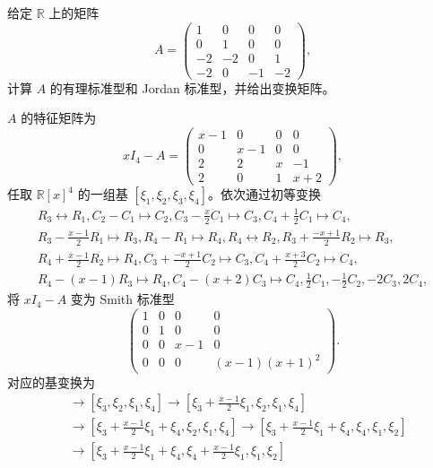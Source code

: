 \documentclass[fontset=none,zihao=-4]{Notes}
\begin{document}
\begin{example}
  给定 $\mathbb{R}$ 上的矩阵
  \[
    A=\begin{pmatrix}
      1 & 0 & 0 & 0 \\
      0 & 1 &  0 & 0 \\
      -2 & -2 & 0 & 1 \\
      -2 & 0 & -1 & -2
    \end{pmatrix}  ,
  \]
  计算 $A$ 的有理标准型和 Jordan 标准型，并给出变换矩阵。
\end{example}
\begin{solution}
  $A$ 的特征矩阵为
  \[
    xI_4-A=\begin{pmatrix}
      x-1 & 0 & 0 & 0 \\
      0 & x-1 & 0 & 0 \\
      2 & 2 & x & -1 \\
      2 & 0 & 1 & x+2
    \end{pmatrix} ,
  \]  
  任取 $\mathbb{R}[x]^4$ 的一组基 $[\xi_1,\xi_2,\xi_3,\xi_4]$。依次通过初等变换
  \begin{gather*}
    R_3\leftrightarrow R_1,C_2-C_1\mapsto C_2,C_3-\frac{x}{2}C_1\mapsto C_3,
    C_4+\frac{1}{2}C_1\mapsto C_4,\\
    R_3-\frac{x-1}{2}R_1\mapsto R_3,R_4-R_1\mapsto R_4,R_4\leftrightarrow R_2,
    R_3+\frac{-x+1}{2}R_2\mapsto R_3,\\
    R_4+\frac{x-1}{2}R_2\mapsto R_4,C_3+\frac{-x+1}{2}C_2\mapsto C_3,
    C_4+\frac{x+3}{2}C_2\mapsto C_4,\\
    R_4-(x-1)R_3\mapsto R_4,C_4-(x+2)C_3\mapsto C_4,\frac{1}{2}C_1,-\frac{1}{2}C_2,
    -2C_3,2C_4,
  \end{gather*}
  将 $xI_4-A$ 变为 Smith 标准型
  \[
    \begin{pmatrix}
      1 & 0 & 0 & 0 \\
      0 & 1 & 0 & 0 \\
      0 & 0 & x-1 & 0 \\
      0 & 0 & 0 & (x-1)(x+1)^2
    \end{pmatrix}  .
  \]
  对应的基变换为
  \begin{align*}
    [\xi_1,\xi_2,\xi_3,\xi_4]&\to \left[\xi_3,\xi_2,\xi_1,\xi_4\right]
    \to \left[\xi_3+\frac{x-1}{2}\xi_1,\xi_2,\xi_1,\xi_4\right]\\
    &\to \left[\xi_3+\frac{x-1}{2}\xi_1+\xi_4,\xi_2,\xi_1,\xi_4\right]
    \to\left[\xi_3+\frac{x-1}{2}\xi_1+\xi_4,\xi_4,\xi_1,\xi_2\right]\\
    &\to\left[\xi_3+\frac{x-1}{2}\xi_1+\xi_4,\xi_4+\frac{x-1}{2}\xi_1,\xi_1,\xi_2\right]\\

\end{align*}
\end{solution}
\end{document}
